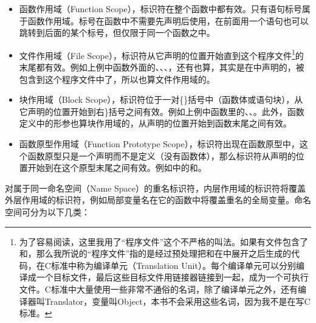 \begin{itemize}

\item 函数作用域（Function Scope），标识符在整个函数中都有效。只有语句标号属于函数作用域。标号在函数中不需要先声明后使用，在前面用一个语句也可以跳转到后面的某个标号，但仅限于同一个函数之中。

\item 文件作用域（File Scope），标识符从它声明的位置开始直到这个程序文件\footnote[30]{为了容易阅读，这里我用了“程序文件”这个不严格的叫法。如果有文件包含了和，那么我所说的“程序文件”指的是经过预处理把和在中展开之后生成的代码，在C标准中称为编译单元（Translation Unit）。每个编译单元可以分别编译成一个目标文件，最后这些目标文件用链接器链接到一起，成为一个可执行文件。C标准中大量使用一些非常不通俗的名词，除了编译单元之外，还有编译器叫Translator，变量叫Object，本书不会采用这些名词，因为我不是在写C标准。}的末尾都有效。例如上例中函数外面的、、、，还有也算，其实是在中声明的，被包含到这个程序文件中了，所以也算文件作用域的。

\item 块作用域（Block Scope），标识符位于一对\{\}括号中（函数体或语句块），从它声明的位置开始到右\}括号之间有效。例如上例中函数里的、、。此外，函数定义中的形参也算块作用域的，从声明的位置开始到函数末尾之间有效。

\item 函数原型作用域（Function Prototype Scope），标识符出现在函数原型中，这个函数原型只是一个声明而不是定义（没有函数体），那么标识符从声明的位置开始到在这个原型末尾之间有效。例如中的和。
\end{itemize}


对属于同一命名空间（Name Space）的重名标识符，内层作用域的标识符将覆盖外层作用域的标识符，例如局部变量名在它的函数中将覆盖重名的全局变量。命名空间可分为以下几类：


